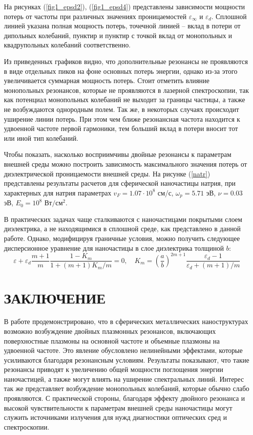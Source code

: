 \documentclass[12pt, a4paper]{article}
\def \eps {\varepsilon}
\def \w {\omega}
\begin{document}
На рисунках (\ref{fig1_epsd2}), (\ref{fig1_epsd4}) представлены зависимости мощности потерь от частоты при различных значениях проницаемостей $\eps_\infty$ и $\eps_d$. Сплошной линией указана полная мощность потерь, точечной линией – вклад в потери от дипольных колебаний, пунктир и пунктир с точкой вклад от монопольных и квадрупольных колебаний соответственно. 

Из приведенных графиков видно, что дополнительные резонансы не проявляются в виде отдельных пиков на фоне основных потерь энергии, однако из-за этого увеличивается суммарная мощность потерь. Стоит отметить влияние монопольных резонансов, которые не проявляются в лазерной спектроскопии, так как потенциал монопольных колебаний не выходит за границы частицы, а также не возбуждаются однородным полем. Так же, в некоторых случаях происходит уширение линии потерь. При этом чем ближе резонансная частота находится к удвоенной частоте первой гармоники, тем больший вклад в потери вносит тот или иной тип колебаний.

Чтобы показать, насколько восприимчивы двойные резонансы к параметрам внешней среды можно построить зависимость максимального значения потерь от диэлектрической проницаемости внешней среды. На рисунке (\ref{natr}) представлены результаты расчетов для сферической наночастицы натрия, при характерных для натрия параметрах $v_F = 1.07\cdot10^8$ см/с, $\w_p = 5.71$ эВ, $\nu = 0.03$ эВ, $E_0=10^8$ $\text{Вт}/\text{см}^2$.

В практических задачах чаще сталкиваются с наночастицами покрытыми слоем диэлектрика, а не находящимися в сплошной среде, как представлено в данной работе. Однако, модифицируя граничные условия, можно получить следующее дисперсионное уравнение для наночастицы в слое диэлектрика толщиной $b$:
\begin{equation} 	
	\eps + \eps_d\frac{m+1}{m}  \frac{1-K_m}{1 + (m+1)K_m/m} = 0, \quad K_m = (\frac{a}{b})^{2m+1} \frac{\eps_d - 1}{\eps_d + (m+1)/m}
\end{equation}

\section{ЗАКЛЮЧЕНИЕ}

В работе продемонстрировано, что в сферических металлических наноструктурах возможно возбуждение двойных плазмонных резонансов, включающих поверхностные плазмоны на основной частоте и объемные плазмоны на удвоенной частоте. Это явление обусловлено нелинейными эффектами, которые усиливаются благодаря резонансным условиям. Результаты показывают, что такие резонансы приводят к увеличению общей мощности поглощения энергии наночастицей, а также могут влиять на уширение спектральных линий. Интерес так же представляет возбуждение монопольных колебаний, которые обычно слабо проявляются. С практической стороны, благодаря эффекту двойного резонанса и высокой чувствительности к параметрам внешней среды наночастицы могут служить источниками излучения для нужд диагностики оптических сред и спектроскопии.
\newpage
\end{document}
